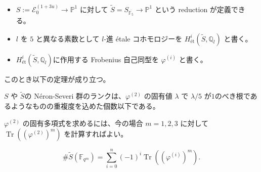\documentclass{classes/mybeamer}
\DeclareMathOperator{\Tr}{Tr}
\newcommand{\Neron}{N\'eron}
\begin{document}
\begin{frame}
    \begin{itemize}
        \item $S:=\mathcal{E}_{0}^{(1 + 3u)}\to \mathbb{P}^{1}$ に対して $\tilde{S} = S_{\overline{\mathbb{F}_5}} \to \mathbb{P}^1$ という reduction が定義できる。
        \item $l$ を $5$ と異なる素数として $l$-進 \'etale コホモロジーを $H^{i}_{\text{\'et}}(\tilde{S}, \mathbb{Q}_l)$ と書く。
        \item $H^{i}_{\text{\'et}}(\tilde{S}, \mathbb{Q}_l)$に作用する Frobenius 自己同型を $\varphi^{(i)}$ と書く。
    \end{itemize}
    このとき以下の定理が成り立つ。
    \begin{thm}
        \label{cor:ns_upper_bound}
        $S$ や $\tilde{S}$の \Neron-Severi 群のランクは、$\varphi^{(2)}$ の固有値 $\lambda$ で $\lambda/5$ が$1$のべき根であるようなものの重複度を込めた個数以下である。
    \end{thm}
    $\varphi^{(2)}$ の固有多項式を求めるには、今の場合 $m=1,2,3$ に対して $\Tr((\varphi^{(2)})^m)$ を計算すればよい。
    \begin{thm}
        \begin{equation*}
            \# \tilde{S}(\mathbb{F}_{q^{m}}) = \sum_{i = 0}^{n} ( - 1)^{i} \Tr((\varphi^{(i)})^{m}).
        \end{equation*}
    \end{thm}
\end{frame}
\end{document}
